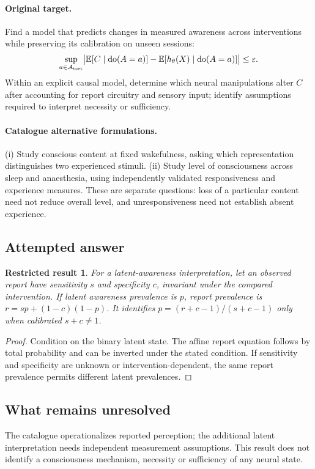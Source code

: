 \documentclass[11pt]{article}
\newcommand{\E}{\mathbb E}
\providecommand{\E}{\mathbb E}
\newtheorem{attemptresult}{Restricted result}[section]
\begin{document}
\paragraph{Original target.}
Find a model that predicts changes in measured awareness across interventions while preserving its calibration on unseen sessions:
\[
\sup_{a\in\mathcal A_{\rm test}}\bigl|\E[C\mid\operatorname{do}(A=a)]-\E[h_\theta(X)\mid\operatorname{do}(A=a)]\bigr|\leq\varepsilon.
\]
Within an explicit causal model, determine which neural manipulations alter $C$ after accounting for report circuitry and sensory input; identify assumptions required to interpret necessity or sufficiency.
\paragraph{Catalogue alternative formulations.}
(i) Study conscious content at fixed wakefulness, asking which representation distinguishes two experienced stimuli. (ii) Study level of consciousness across sleep and anaesthesia, using independently validated responsiveness and experience measures. These are separate questions: loss of a particular content need not reduce overall level, and unresponsiveness need not establish absent experience.
\subsection{Attempted answer}
\begin{attemptresult}
For a latent-awareness interpretation, let an observed report have sensitivity $s$ and specificity $c$, invariant under the compared intervention. If latent awareness prevalence is $p$, report prevalence is $r=sp+(1-c)(1-p)$. It identifies $p=(r+c-1)/(s+c-1)$ only when calibrated $s+c\ne1$.
\end{attemptresult}
\begin{proof}
Condition on the binary latent state. The affine report equation follows by total probability and can be inverted under the stated condition. If sensitivity and specificity are unknown or intervention-dependent, the same report prevalence permits different latent prevalences.
\end{proof}
\subsection{What remains unresolved}
The catalogue operationalizes reported perception; the additional latent interpretation needs independent measurement assumptions. This result does not identify a consciousness mechanism, necessity or sufficiency of any neural state.
\end{document}
